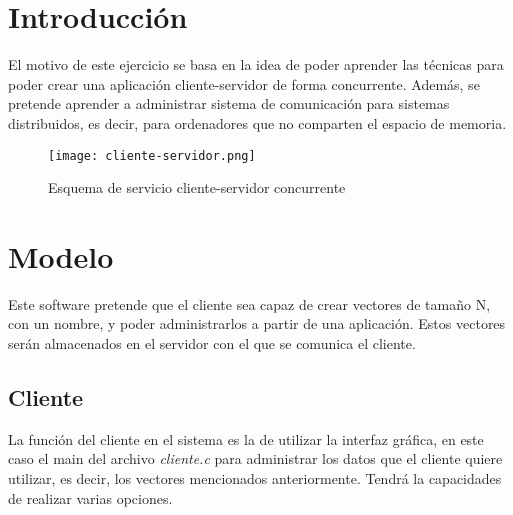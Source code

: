 \documentclass[10pt, spanish, pdftex]{template/UC3M_document}
\author{Alejandro Prieto Macías}         %
\begin{document}
\titleMain

\begin{spacing}{0.5}
    \hypersetup{linkcolor=black}    %
    \tableofcontents\newpage        %
\end{spacing}


\section{Introducción}\label{section_label}
El motivo de este ejercicio se basa en la idea de poder aprender las técnicas para poder crear una aplicación cliente-servidor de forma concurrente. Además, se pretende aprender a administrar sistema de comunicación para sistemas distribuidos, es decir, para ordenadores que no comparten el espacio de memoria.

  \vspace{2cm}
  \begin{figure}[h]
    \centering
    \texttt{[image: cliente-servidor.png]}
    \caption{Esquema de servicio cliente-servidor concurrente}
  \end{figure}


\newpage
\section{Modelo}
Este software pretende que el cliente sea capaz de crear vectores de tamaño N, con un nombre, y poder administrarlos a partir de una aplicación. Estos vectores serán almacenados en el servidor con el que se comunica el cliente.

\subsection{Cliente}
La función del cliente en el sistema es la de utilizar la interfaz gráfica, en este caso el main del archivo \textit{cliente.c} para administrar los datos que el cliente quiere utilizar, es decir, los vectores mencionados anteriormente. Tendrá la capacidades de realizar varias opciones.
\end{document}
